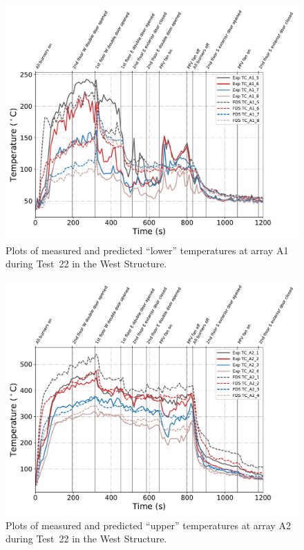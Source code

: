 \begin{figure}[!h]
	\centering
	\includegraphics[width=\columnwidth]{Figures/Plots/Validation/Temperature/Test_22_TC_A1_lower}
	\caption{Plots of measured and predicted ``lower'' temperatures at array A1 during Test~22 in the West Structure.}
	\label{fig:TCA1_lower_data_Test22}
\end{figure}

\begin{figure}[!h]
	\centering
	\includegraphics[width=\columnwidth]{Figures/Plots/Validation/Temperature/Test_22_TC_A2_upper}
	\caption{Plots of measured and predicted ``upper'' temperatures at array A2 during Test~22 in the West Structure.}
	\label{fig:TCA2_upper_data_Test22}
\end{figure}

